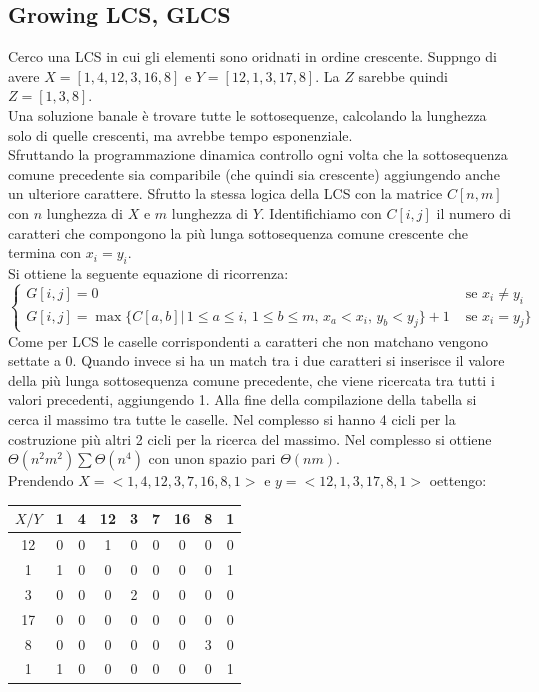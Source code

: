 \documentclass[a4paper,12pt, oneside]{book}
\begin{document}
\subsection{Growing LCS, GLCS}
Cerco una LCS in cui gli elementi sono oridnati in ordine crescente.
Suppngo di avere $X=[1,4,12,3,16,8]$ e $Y=[12,1,3,17,8]$. La $Z$
sarebbe quindi $Z=[1,3,8]$.\\
Una soluzione banale è trovare tutte le sottosequenze, calcolando la
lunghezza solo di quelle crescenti, ma avrebbe tempo esponenziale.\\
Sfruttando la programmazione dinamica controllo ogni volta che la
sottosequenza comune precedente sia comparibile (che quindi sia
crescente) aggiungendo anche un ulteriore carattere. Sfrutto la stessa
logica della LCS con la matrice $C[n,m]$ con $n$ lunghezza di $X$ e
$m$ lunghezza di $Y$. Identifichiamo con $C[i,j]$ il numero di
caratteri che compongono la più lunga sottosequenza comune crescente
che termina con $x_i=y_i$.\\
Si ottiene la seguente equazione di ricorrenza:
\[
  \begin{cases}
    G[i,j] = 0 & \mbox{ se } x_i\neq y_i\\
    G[i,j] = \max\{C[a,b]|\, 1\leq a\leq i,\,1\leq b \leq m,\, x_a<
    x_i,\, y_b< y_j\}+1 & \mbox{ se } x_i=y_j\}
  \end{cases}
\]
Come per LCS le caselle corrispondenti a caratteri che non matchano
vengono settate a 0. Quando invece si ha un match tra i due caratteri
si inserisce il valore della più lunga sottosequenza comune
precedente, che viene ricercata tra tutti i valori precedenti, 
aggiungendo 1. Alla fine della compilazione della tabella si cerca il
massimo tra tutte le caselle. Nel complesso si hanno 4 cicli per la
costruzione più altri 2 cicli per la ricerca del massimo. Nel
complesso si ottiene $\Theta(n^2m^2)\sum \Theta(n^4)$ con unon spazio
pari $\Theta(nm)$.\\
Prendendo $X=<1,4,12,3,7,16,8,1>$ e $y=<12,1,3,17,8,1>$
oettengo:
\begin{center}
  \begin{tabular}{|c|c|c|c|c|c|c|c|c|}
    \hline
    $X/Y$ & {1} & {4} & {12} & {3} & {7} & {16} & {8} & {1}\\
    \hline
    {12} & {0} & {0} & {1} & {0} & {0} & {0} & {0} & {0}\\
    \hline
    {1} & {1} & {0} & {0} & {0} & {0} & {0} & {0} & {1}\\
    \hline
    {3} & {0} & {0} & {0} & {2} & {0} & {0} & {0} & {0} \\
    \hline
    {17} & {0} & {0} & {0} & {0} & {0} & {0} & {0} & {0}\\
    \hline
    {8} & {0} & {0} & {0} & {0} & {0} & {0} & {3} & {0}\\
    \hline
    {1} & {1} & {0} & {0} & {0} & {0} & {0} & {0} & {1}\\
    \hline
  \end{tabular}
\end{center}
\end{document}
